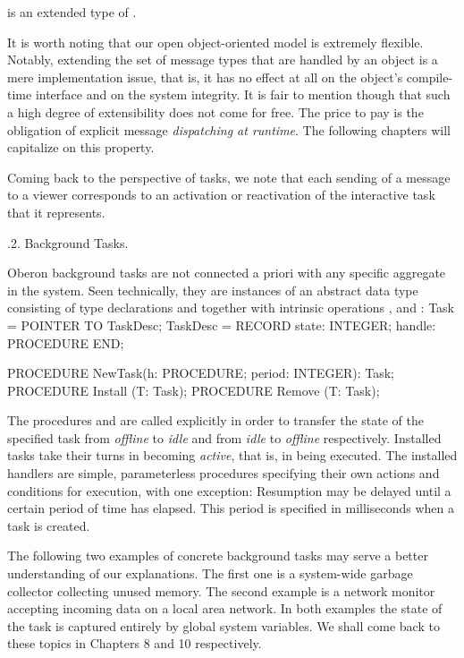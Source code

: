 \noindent is an extended type of .

It is worth noting that our open object-oriented model is extremely
flexible. Notably, extending the set of message types that are handled
by an object is a mere implementation issue, that is, it has no effect
at all on the object’s compile-time interface and on the system
integrity. It is fair to mention though that such a high degree of
extensibility does not come for free. The price to pay is the
obligation of explicit message \emph{dispatching at runtime}. The following
chapters will capitalize on this property.

Coming back to the perspective of tasks, we note that each sending of
a message to a viewer corresponds to an activation or reactivation of
the interactive task that it represents.

.2. Background Tasks.

Oberon background tasks are not connected a priori with any specific
aggregate in the system. Seen technically, they are instances of an
abstract data type consisting of type declarations  and 
together with intrinsic operations ,  and :
\begintt
Task = POINTER TO TaskDesc;
TaskDesc = RECORD state: INTEGER; handle: PROCEDURE END;

PROCEDURE NewTask(h: PROCEDURE; period: INTEGER): Task;
PROCEDURE Install (T: Task);
PROCEDURE Remove (T: Task);
\endtt

\noindent The procedures  and  are called explicitly in order to
transfer the state of the specified task from \emph{offline\/} to \emph{idle\/} and from
\emph{idle\/} to \emph{offline\/} respectively. Installed tasks take their turns in
becoming \emph{active\/}, that is, in being executed. The installed handlers
are simple, parameterless procedures specifying their own actions and
conditions for execution, with one exception: Resumption may be
delayed until a certain period of time has elapsed. This period is
specified in milliseconds when a task is created.

The following two examples of concrete background tasks may serve a
better understanding of our explanations. The first one is a
system-wide garbage collector collecting unused memory. The second
example is a network monitor accepting incoming data on a local area
network. In both examples the state of the task is captured entirely
by global system variables. We shall come back to these topics in
Chapters 8 and 10 respectively.

